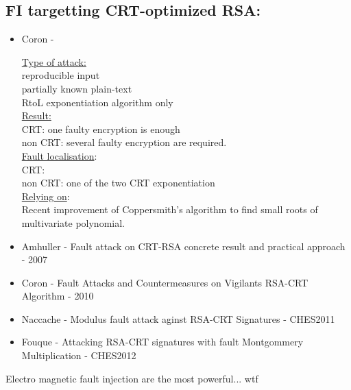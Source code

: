 \subsection*{FI targetting CRT-optimized RSA:}
\begin{itemize}
\item Coron - \cite{ches-2009-coron}

\underline{Type of attack:}\\
reproducible input\\
partially known plain-text \\
RtoL exponentiation algorithm only\\
\underline{Result:}\\
CRT: one faulty encryption is enough\\
non CRT: several faulty encryption are required.\\
\underline{Fault localisation}:\\
CRT:\\
non CRT: one of the two CRT exponentiation\\
\underline{Relying on}:\\
Recent improvement of Coppersmith's algorithm to find small 
roots of multivariate polynomial.


\item Amhuller - Fault attack on CRT-RSA concrete 
result and practical approach - 2007
\item Coron - Fault Attacks and Countermeasures on 
Vigilants RSA-CRT Algorithm - 2010
\item Naccache - Modulus fault attack aginst RSA-CRT Signatures - CHES2011
\item Fouque - Attacking RSA-CRT signatures with fault 
Montgommery Multiplication - CHES2012
\end{itemize}
Electro magnetic fault injection are the most powerful... wtf
